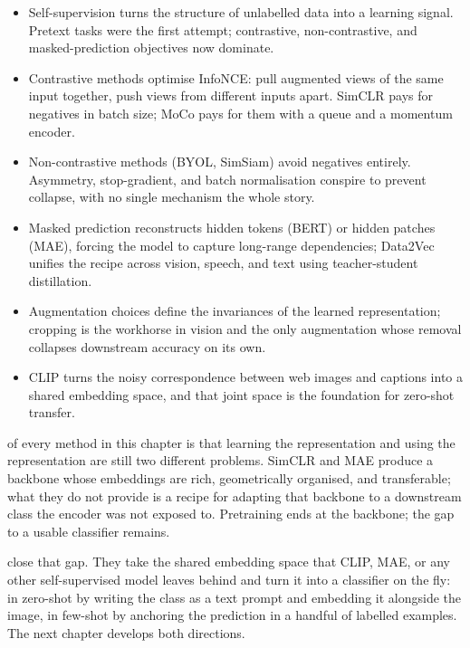 \begin{itemize}
    \item Self-supervision turns the structure of unlabelled data into a learning signal. Pretext tasks were the first attempt; contrastive, non-contrastive, and masked-prediction objectives now dominate.
    \item Contrastive methods optimise InfoNCE: pull augmented views of the same input together, push views from different inputs apart. SimCLR pays for negatives in batch size; MoCo pays for them with a queue and a momentum encoder.
    \item Non-contrastive methods (BYOL, SimSiam) avoid negatives entirely. Asymmetry, stop-gradient, and batch normalisation conspire to prevent collapse, with no single mechanism the whole story.
    \item Masked prediction reconstructs hidden tokens (BERT) or hidden patches (MAE), forcing the model to capture long-range dependencies; Data2Vec unifies the recipe across vision, speech, and text using teacher-student distillation.
    \item Augmentation choices define the invariances of the learned representation; cropping is the workhorse in vision and the only augmentation whose removal collapses downstream accuracy on its own.
    \item CLIP turns the noisy correspondence between web images and captions into a shared embedding space, and that joint space is the foundation for zero-shot transfer.
\end{itemize}


 of every method in this chapter is that learning the representation and using the representation are still two different problems. SimCLR and MAE produce a backbone whose embeddings are rich, geometrically organised, and transferable; what they do not provide is a recipe for adapting that backbone to a downstream class the encoder was not exposed to. Pretraining ends at the backbone; the gap to a usable classifier remains.

 close that gap. They take the shared embedding space that CLIP, MAE, or any other self-supervised model leaves behind and turn it into a classifier on the fly: in zero-shot by writing the class as a text prompt and embedding it alongside the image, in few-shot by anchoring the prediction in a handful of labelled examples. The next chapter develops both directions.


